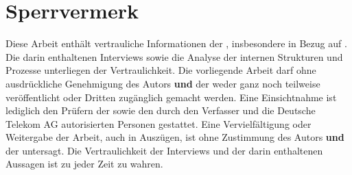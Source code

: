 \section*{Sperrvermerk}
\label{sec:Sperrvermerk}
Diese Arbeit enthält vertrauliche Informationen der \betriebName, insbesondere in Bezug auf \titlePruefung. Die darin enthaltenen Interviews sowie die Analyse der internen Strukturen und Prozesse unterliegen der Vertraulichkeit.
\br
Die vorliegende Arbeit darf ohne ausdrückliche Genehmigung des Autors \textbf{und} der \betriebName weder ganz noch teilweise veröffentlicht oder Dritten zugänglich gemacht werden. Eine Einsichtnahme ist lediglich den Prüfern der \insitution sowie den durch den Verfasser und die Deutsche Telekom AG autorisierten Personen gestattet. Eine Vervielfältigung oder Weitergabe der Arbeit, auch in Auszügen, ist ohne Zustimmung des Autors \textbf{und} der \betriebName  untersagt.
\br
Die Vertraulichkeit der Interviews und der darin enthaltenen Aussagen ist zu jeder Zeit zu wahren.
